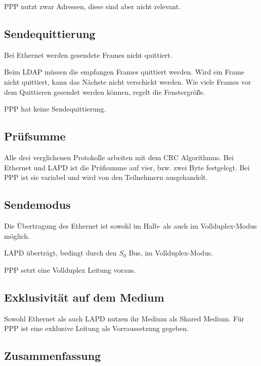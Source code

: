 \documentclass[12pt, a4paper, ngerman]{article}
\begin{document}
PPP nutzt zwar Adressen, diese sind aber nicht relevant.

\subsection{Sendequittierung}
Bei Ethernet werden gesendete Frames nicht quittiert. 

Beim LDAP müssen die empfangen Frames quittiert werden. Wird ein Frame nicht quittiert, kann das Nächste nicht verschickt werden. Wie viele Frames vor dem Quittieren gesendet werden können, regelt die Fenstergröße.

PPP hat keine Sendequittierung.

\subsection{Prüfsumme} 
Alle drei verglichenen Protokolle arbeiten mit dem CRC Algorithmus. Bei Ethernet und LAPD ist die Prüfsumme auf vier, bzw. zwei Byte festgelegt. Bei PPP ist sie variabel und wird von den Teilnehmern ausgehandelt. 

\subsection{Sendemodus}
Die Übertragung des Ethernet ist sowohl im Halb- als auch im Vollduplex-Modus möglich. 

LAPD überträgt, bedingt durch den $S_0$ Bus, im Vollduplex-Modus.

PPP setzt eine Vollduplex Leitung voraus.

\subsection{Exklusivität auf dem Medium}
Sowohl Ethernet als auch LAPD nutzen ihr Medium als Shared Medium.
Für PPP ist eine exklusive Leitung als Vorraussetzung gegeben.

\subsection{Zusammenfassung}
\end{document}
